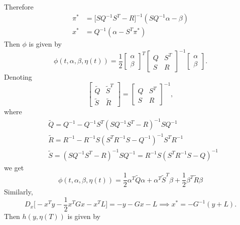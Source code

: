 Therefore
\begin{align*}
    \pi^\ast &= \big[ S Q^{-1}S^T - R \big]^{-1}(S Q^{-1} \alpha - \beta)\\
    x^\ast &= Q^{-1} (\alpha - S^T \pi^\ast)
\end{align*}
Then $\phi$ is given by
\begin{equation*}
    \phi(t, \alpha, \beta,\eta(t)) = 
    \frac12
    \begin{bmatrix}
        \alpha\\
        \beta
    \end{bmatrix}^T
    \begin{bmatrix}
        Q & S^T\\
        S & R
    \end{bmatrix}^{-1}
    \begin{bmatrix}
        \alpha\\
        \beta
    \end{bmatrix}. 
\end{equation*}
Denoting
\begin{equation*}\begin{bmatrix}
        \tilde{Q} & \tilde{S}^T\\
        \tilde{S} & \tilde{R}
    \end{bmatrix}
    =
    \begin{bmatrix}
        Q & S^T\\
        S & R
    \end{bmatrix}^{-1},
\end{equation*}
where
\begin{align}
    &\tilde{Q} = Q^{-1} - Q^{-1} S^T (S Q^{-1} S^T - R)^{-1}S Q^{-1} \label{eq: markov_tilde_q}\\
    &\tilde{R} = R^{-1} - R^{-1} S (S^T R^{-1}S - Q^{-1})^{-1}S^T R^{-1} \label{eq: markov_tilde_r}\\
    &\tilde{S} = (S Q^{-1} S^T - R)^{-1}S Q^{-1} = R^{-1}S(S^TR^{-1}S - Q)^{-1} \label{eq: markov_tilde_s}
\end{align}
we get
\begin{equation}
    \phi(t, \alpha, \beta, \eta(t)) = \frac12 \alpha^T \tilde{Q} \alpha + \alpha^T \tilde{S}^T \beta + \frac12 \beta^T \tilde{R} \beta \label{eq: markov_phi}
\end{equation}
Similarly, 
\begin{equation*}
    D_x \big[-x^T y - \frac12 x^T G x - x^T L \big] = -y - Gx - L \implies x^\ast = - G^{-1} (y + L).
\end{equation*}
Then $h(y, \eta(T))$ is given by

